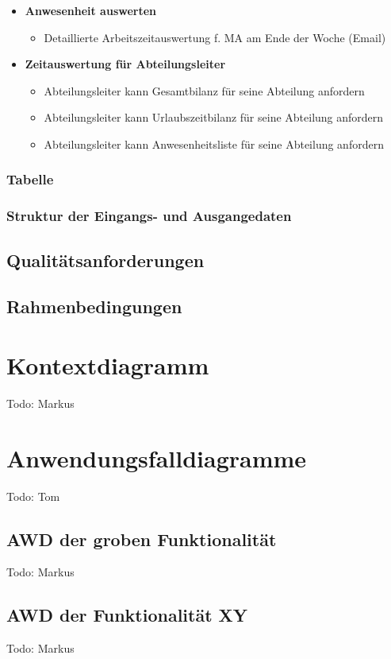 \begin{itemize}
	\item \textbf{Anwesenheit auswerten}
	\begin{itemize}
		\item Detaillierte Arbeitszeitauswertung f. MA am Ende der Woche (Email)
	\end{itemize}
	
	\item \textbf{Zeitauswertung f\"ur Abteilungsleiter}
	\begin{itemize}
		\item Abteilungsleiter kann Gesamtbilanz f\"ur seine Abteilung anfordern
		\item Abteilungsleiter kann Urlaubszeitbilanz f\"ur seine Abteilung anfordern
		\item Abteilungsleiter kann Anwesenheitsliste f\"ur seine Abteilung anfordern
	\end{itemize}
\end{itemize}

\subsection{Tabelle}

\subsection{Struktur der Eingangs- und Ausgangedaten}

\section{Qualit\"atsanforderungen}

\section{Rahmenbedingungen}

\chapter{Kontextdiagramm}
Todo: Markus
\chapter{Anwendungsfalldiagramme}
Todo: Tom
\section{AWD der groben Funktionalität}
Todo: Markus
\section{AWD der Funktionalität XY}
Todo: Markus
